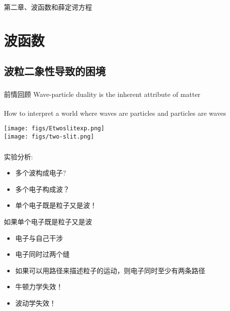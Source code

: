 \begin{frame} [plain]
    \frametitle{}
    \begin{center}
    { {\huge 第二章、波函数和薛定谔方程}}
    \end{center}  
    \addtocounter{framenumber}{-1}   
\end{frame}

\section{波函数}

\subsection{波粒二象性导致的困境}

\begin{frame}
    \frametitle{}
    \begin{atcbox}{前情回顾}
        Wave-particle duality is the inherent attribute of matter\\
        ~~\\
        How to interpret a world where waves are particles and particles are waves
    \end{atcbox}
\end{frame}

\begin{frame}
    \begin{center}
        \texttt{[image: figs/Etwoslitexp.png]} \\
        \texttt{[image: figs/two-slit.png]} \\
    \end{center} 
\end{frame}

\begin{frame}
    \frametitle{}
    实验分析:\\
    \begin{itemize}
         \item 多个波构成电子? 
         \item 多个电子构成波？ 
         \item 单个电子既是粒子又是波！ 
    \end{itemize}
\end{frame}

\begin{frame}
    如果单个电子既是粒子又是波 \\
\begin{itemize}
     \item  电子与自己干涉 
     \item  电子同时过两个缝  
     \item  如果可以用路径来描述粒子的运动，则电子同时至少有两条路径 
     \item  牛顿力学失效！ 
     \item  波动学失效！ 
\end{itemize}
\end{frame}

